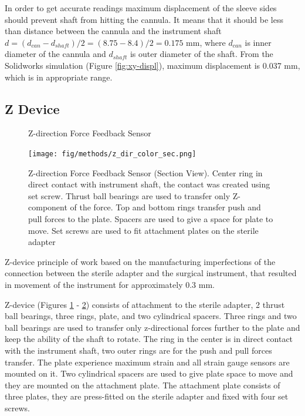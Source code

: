 In order to get accurate readings maximum displacement of the sleeve sides should prevent shaft from hitting the cannula. It means that it should be less than distance between the cannula and the instrument shaft $d=(d_{can} - d_{shaft})/2 = (8.75 - 8.4)/2 = 0.175$ mm, where $d_{can}$ is inner diameter of the cannula and $d_{shaft}$ is outer diameter of the shaft. From the Solidworks simulation (Figure \ref{fig:xy-displ}), maximum displacement is 0.037 mm, which is in appropriate range.

\subsection{Z Device}
\label{sec:zDir}

\begin{figure}[h]%
\centering
{}%
\qquad
{}%
\caption{Z-direction Force Feedback Sensor}
\label{fig:Z_device_design}%
\end{figure}

\begin{figure}[h]
	\begin{center}
		\texttt{[image: fig/methods/z\_dir\_color\_sec.png]}
	\end{center}
	\vspace{-4mm}
	\caption[Z-direction Force Feedback Sensor (Section View)]
	{Z-direction Force Feedback Sensor (Section View). Center ring in direct contact with instrument shaft, the contact was created using set screw. Thrust ball bearings are used to transfer only Z-component of the force. Top and bottom rings transfer push and pull forces to the plate. Spacers are used to give a space for plate to move. Set screws are used to fit attachment plates on the sterile adapter}
	\label{fig:Z-direction_sec}
	\vspace{-2mm}
\end{figure}

Z-device principle of work based on the manufacturing imperfections of the connection between the sterile adapter and the surgical instrument, that resulted in movement of the instrument for approximately 0.3 mm.

Z-device (Figures \ref{fig:Z_device_design} - \ref{fig:Z-direction_sec}) consists of attachment to the sterile adapter, 2 thrust ball bearings, three rings, plate, and two cylindrical spacers. Three rings and two ball bearings are used to transfer only z-directional forces further to the plate and keep the ability of the shaft to rotate. The ring in the center is in direct contact with the instrument shaft, two outer rings are for the push and pull forces transfer. The plate experience maximum strain and all strain gauge sensors are mounted on it.  Two cylindrical spacers are used to give plate space to move and they are mounted on the attachment plate. The attachment plate consists of three plates, they are press-fitted on the sterile adapter and fixed with four set screws.

